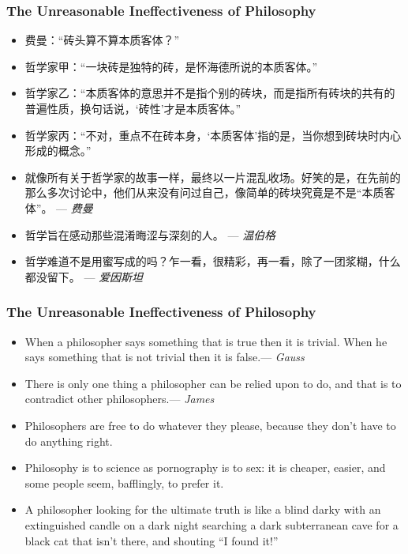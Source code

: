 \documentclass[UTF8,11pt,colorlinks,compress,openany]{beamer}%
\begin{document}
\begin{frame}\frametitle{The Unreasonable Ineffectiveness of Philosophy}
	\begin{block}{}\small
		\begin{itemize}
			\item 费曼：“砖头算不算本质客体？”
			\item 哲学家甲：“一块砖是独特的砖，是怀海德所说的本质客体。” 
			\item 哲学家乙：“本质客体的意思并不是指个别的砖块，而是指所有砖块的共有的普遍性质，换句话说，‘砖性’才是本质客体。”
			\item 哲学家丙：“不对，重点不在砖本身，‘本质客体’指的是，当你想到砖块时内心形成的概念。”
			\item 就像所有关于哲学家的故事一样，最终以一片混乱收场。好笑的是，在先前的那么多次讨论中，他们从来没有问过自己，像简单的砖块究竟是不是“本质客体”。
			\hfill --- \textsl{费曼}
		\end{itemize}
	\end{block}
\begin{itemize}
	\item 哲学旨在感动那些混淆晦涩与深刻的人。 \hfill --- \textsl{温伯格}
	\item 哲学难道不是用蜜写成的吗？乍一看，很精彩，再一看，除了一团浆糊，什么都没留下。 \hfill --- \textsl{爱因斯坦}
\end{itemize}
\end{frame}

\begin{frame}\frametitle{The Unreasonable Ineffectiveness of Philosophy}
	\begin{itemize}
		\item When a philosopher says something that is true then it is trivial. When he says something that is not trivial then it is false.\hfill --- \textsl{Gauss}
		\item There is only one thing a philosopher can be relied upon to do, and that is to contradict other philosophers.\hfill --- \textsl{James}
		\item Philosophers are free to do whatever they please, because they don't have to do anything right.
		\item Philosophy is to science as pornography is to sex: it is cheaper, easier, and some people seem, bafflingly, to prefer it.
		\item A philosopher looking for the ultimate truth is like a blind darky with an extinguished candle on a dark night searching a dark subterranean cave for a black cat that isn't there, and shouting ``I found it!''
	\end{itemize}
\end{frame}
\end{document}
